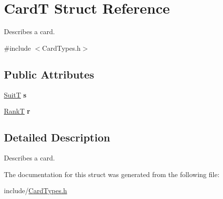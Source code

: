 \hypertarget{struct_card_t}{}\section{CardT Struct Reference}
\label{struct_card_t}


Describes a card.  




{\ttfamily \#include $<$Card\+Types.\+h$>$}

\subsection*{Public Attributes}
\begin{DoxyCompactItemize}
\item 
\mbox{\label{struct_card_t_a385c4f8ec261203df28f85f69f28780d}} 
\hyperlink{_card_types_8h_a693d1a7b7ef1b91ead9c7dfc49830565}{SuitT} {\bfseries s}
\item 
\mbox{\label{struct_card_t_a306faf354f2fb4bb43439f84bbc49f05}} 
\hyperlink{_card_types_8h_aa7b61ab74252d345d621b846db6238f1}{RankT} {\bfseries r}
\end{DoxyCompactItemize}


\subsection{Detailed Description}
Describes a card. 

The documentation for this struct was generated from the following file\+:\begin{DoxyCompactItemize}
\item 
include/\hyperlink{_card_types_8h}{Card\+Types.\+h}\end{DoxyCompactItemize}
